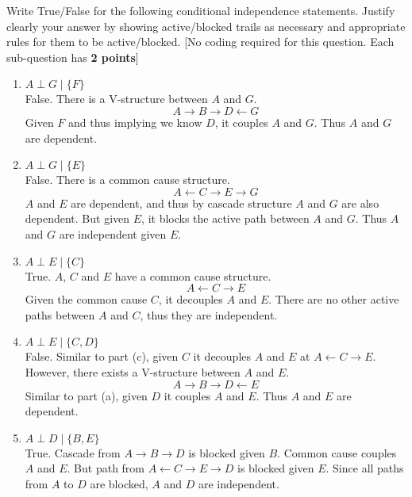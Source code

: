\item Write True/False for the following conditional independence statements. Justify clearly your answer by showing active/blocked trails as necessary and appropriate rules for them to be active/blocked. [No coding required for this question. Each sub-question has \textbf{2 points}]

\begin{enumerate}
      \item $A \perp G \mid \{F\}$\\
            False. There is a V-structure between $A$ and $G$.
            $$A \rightarrow B \rightarrow D \leftarrow G$$
            Given $F$ and thus implying we know $D$, it couples $A$ and $G$. Thus $A$ and $G$ are dependent.
      \item $A \perp G \mid \{E\}$\\
            False. There is a common cause structure.
            $$A \leftarrow C \rightarrow E \rightarrow G$$
            $A$ and $E$ are dependent, and thus by cascade structure $A$ and $G$ are also dependent. But given $E$, it blocks the active path between $A$ and $G$. Thus $A$ and $G$ are independent given $E$.
      \item $A \perp E \mid \{C\}$\\
            True. $A$, $C$ and $E$ have a common cause structure.
            $$A \leftarrow C \rightarrow E$$
            Given the common cause $C$, it decouples $A$ and $E$. There are no other active paths between $A$ and $C$, thus they are independent.
      \item $A \perp E \mid \{C, D\}$\\
            False. Similar to part (c), given $C$ it decouples $A$ and $E$ at $A \leftarrow C \rightarrow E$. However, there exists a V-structure between $A$ and $E$.
            $$A \rightarrow B \rightarrow D \leftarrow E$$
            Similar to part (a), given $D$ it couples $A$ and $E$. Thus $A$ and $E$ are dependent.
      \item $A \perp D \mid \{B, E\}$\\
            True. Cascade from $A \rightarrow B \rightarrow D$ is blocked given $B$. Common cause couples $A$ and $E$. But path from $A \leftarrow C \rightarrow E \rightarrow D$ is blocked given $E$. Since all paths from $A$ to $D$ are blocked, $A$ and $D$ are independent.
\end{enumerate}
\clearpage